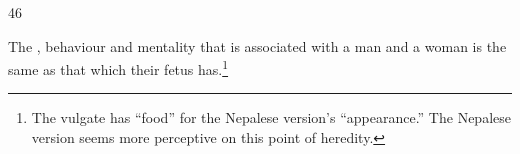 \begin{translation}
    
\item[46]

The , behaviour and mentality that is associated with a 
man and a woman is the same as that which their fetus has.\footnote{The 
vulgate has “food” for the Nepalese version's  “appearance.”  
The Nepalese version seems more perceptive on this point of heredity.}



    


    
    

%
%
%
%
%
%
%
%
%
%

\end{translation}
